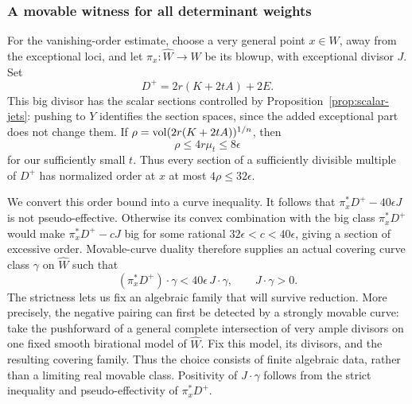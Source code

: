\subsubsection{A movable witness for all determinant weights}

For the vanishing-order estimate, choose a very general point
\(x\in W\), away from the exceptional loci, and let
\(\pi_x:\widehat W\to W\) be its blowup, with exceptional
divisor \(J\). Set
\[
 D^+=2r(K+2tA)+2E.
\]
This big divisor has the scalar sections controlled by
Proposition~\ref{prop:scalar-jets}: pushing to \(Y\) identifies the
section spaces, since the added exceptional part does not change them.
If \(\rho=\operatorname{vol}(2r(K+2tA))^{1/n}\), then
\[
 \rho\leq4r\mu_t\leq8\epsilon
\]
for our sufficiently small \(t\). Thus every section of a sufficiently
divisible multiple of \(D^+\) has normalized order at \(x\) at most
\(4\rho\leq32\epsilon\).

We convert this order bound into a curve inequality.
It follows that \(\pi_x^*D^+-40\epsilon J\) is not pseudo-effective.
Otherwise its convex combination with the big class \(\pi_x^*D^+\)
would make \(\pi_x^*D^+-cJ\) big for some rational
\(32\epsilon<c<40\epsilon\), giving a section of excessive order.
Movable-curve duality \cite[Theorem~2.2]{BDPP2013} therefore supplies an
actual covering curve class \(\gamma\) on \(\widehat W\) such that
\begin{equation}
\label{fr:curve-test}
 (\pi_x^*D^+)\cdot\gamma
       <40\epsilon\,J\cdot\gamma,\qquad J\cdot\gamma>0.
\end{equation}
The strictness lets us fix an algebraic family that will survive
reduction.  More precisely, the negative pairing can first be detected
by a strongly movable curve: take the pushforward of a general complete
intersection of very ample divisors on one fixed smooth birational
model of \(\widehat W\). Fix this model, its divisors, and the resulting
covering family.  Thus the choice consists of finite algebraic data,
rather than a limiting real movable class.  Positivity of
\(J\cdot\gamma\) follows from the strict inequality and
pseudo-effectivity of \(\pi_x^*D^+\).

